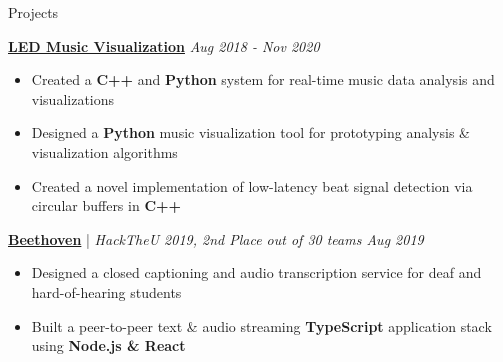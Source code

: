 \documentclass{content/resume/resume}
\begin{document}
\begin{rSection}{Projects}
  
 \href{https://www.linkedin.com/feed/update/urn:li:activity:6603722406240628736/}{\bf LED Music Visualization} \hfill {\em Aug 2018 - Nov 2020}
 \vspace{-6pt}
 \begin{itemize}[nosep]
   \item Created a {\bf C++} and {\bf Python} system for real-time music data analysis and visualizations
   \item Designed a {\bf Python} music visualization tool for prototyping analysis \& visualization algorithms
   \item Created a novel implementation of low-latency beat signal detection via circular buffers in \textbf{C++}
 \end{itemize}
  
  \href{https://devpost.com/software/beethoven-t9ud86}{\bf Beethoven} | {\em HackTheU 2019, 2nd Place out of 30 teams
  \hfill Aug 2019}
  \vspace{-6pt}
  \begin{itemize}[nosep]
    \item Designed a closed captioning and audio transcription service for deaf and hard-of-hearing students
    \item Built a peer-to-peer text \& audio streaming {\bf TypeScript} application stack using {\bf Node.js \& React}
  \end{itemize}
  

\end{rSection}
\end{document}
